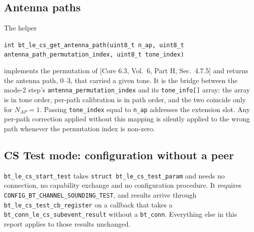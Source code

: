\documentclass[11pt,a4paper]{article}
\newcommand{\code}[1]{\texttt{\small #1}}
\newcommand{\Nap}{\ensuremath{N_{AP}}}
\newcommand{\core}[1]{\textcolor{rulegrey}{\small[Core 6.3, #1]}}
\begin{document}
\subsection{Antenna paths}

The helper
\begin{center}
\code{int bt\_\allowbreak{}le\_\allowbreak{}cs\_\allowbreak{}get\_\allowbreak{}antenna\_\allowbreak{}path(uint8\_\allowbreak{}t n\_\allowbreak{}ap, uint8\_\allowbreak{}t
antenna\_\allowbreak{}path\_\allowbreak{}permutation\_\allowbreak{}index, uint8\_\allowbreak{}t tone\_\allowbreak{}index)}
\end{center}
implements the permutation of \core{Vol.\ 6, Part H, Sec.\ 4.7.5} and returns the
antenna path, 0--3, that carried a given tone. It is the bridge between the mode-2 step's
\code{antenna\_\allowbreak{}permutation\_\allowbreak{}index} and its \code{tone\_\allowbreak{}info[]} array: the array is in tone
order, per-path calibration is in path order, and the two coincide only for
$\Nap=1$. Passing \code{tone\_\allowbreak{}index} equal to \code{n\_\allowbreak{}ap} addresses the extension slot. Any
per-path correction applied without this mapping is silently applied to the wrong path whenever the
permutation index is non-zero.

\subsection{CS Test mode: configuration without a peer}
\label{sec:test}

\code{bt\_\allowbreak{}le\_\allowbreak{}cs\_\allowbreak{}start\_\allowbreak{}test} takes \code{struct bt\_\allowbreak{}le\_\allowbreak{}cs\_\allowbreak{}test\_\allowbreak{}param} and needs no
connection, no capability exchange and no configuration procedure. It requires
\code{CONFIG\_\allowbreak{}BT\_\allowbreak{}CHANNEL\_\allowbreak{}SOUNDING\_\allowbreak{}TEST}, and results arrive through
\code{bt\_\allowbreak{}le\_\allowbreak{}cs\_\allowbreak{}test\_\allowbreak{}cb\_\allowbreak{}register} on a callback that takes a
\code{bt\_\allowbreak{}conn\_\allowbreak{}le\_\allowbreak{}cs\_\allowbreak{}subevent\_\allowbreak{}result} without a \code{bt\_\allowbreak{}conn}. Everything else in
this report applies to those results unchanged.
\end{document}
